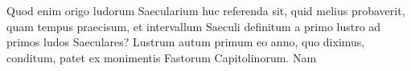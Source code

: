 Quod enim
origo ludorum Saecularium
huc referenda
sit, quid melius probaverit,
quam tempus praecisum, et intervallum Saeculi definitum a
primo lustro ad primos ludos Saeculares?
%
Lustrum autum primum eo
anno, quo diximus, conditum, patet ex monimentis Fastorum Capitolinorum.
Nam

































